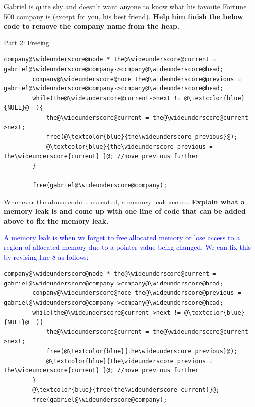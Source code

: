 \documentclass{article}
\newcommand{\wideunderscore}{\underline{\hphantom{n}}}
\begin{document}
\begin{enumerate}[label=(\alph*)]
    Gabriel is quite shy and doesn't want anyone to know what his favorite Fortune 500 company is (except for you, his best friend). \textbf{Help him finish the below code to remove the company name from the heap.}

    Part 2: Freeing
    \begin{lstlisting}[style = CStyle]
        company@\wideunderscore@node * the@\wideunderscore@current = gabriel@\wideunderscore@company->company@\wideunderscore@head;
        company@\wideunderscore@node the@\wideunderscore@previous = gabriel@\wideunderscore@company->company@\wideunderscore@head;
        while(the@\wideunderscore@current->next != @\textcolor{blue}{NULL}@  ){
            the@\wideunderscore@current = the@\wideunderscore@current->next;
            free(@\textcolor{blue}{the\wideunderscore previous}@);
            @\textcolor{blue}{the\wideunderscore previous = the\wideunderscore{current} }@; //move previous further
        }

        free(gabriel@\wideunderscore@company);
    \end{lstlisting}

    Whenever the above code is executed, a memory leak occurs. 
    \textbf{Explain what a memory leak is and come up with one line of code that can be added above to fix the memory leak.}\newline

    \textcolor{blue}{A memory leak is when we forget to free allocated memory or lose access to a region of allocated memory due to a pointer value being changed. We can fix this by revising line 8 as follows:}

    \begin{lstlisting}[style=CStyle]
    company@\wideunderscore@node * the@\wideunderscore@current = gabriel@\wideunderscore@company->company@\wideunderscore@head;
        company@\wideunderscore@node the@\wideunderscore@previous = gabriel@\wideunderscore@company->company@\wideunderscore@head;
        while(the@\wideunderscore@current->next != @\textcolor{blue}{NULL}@  ){
            the@\wideunderscore@current = the@\wideunderscore@current->next;
            free(@\textcolor{blue}{the\wideunderscore previous}@);
            @\textcolor{blue}{the\wideunderscore previous = the\wideunderscore{current} }@; //move previous further
        }
        @\textcolor{blue}{free(the\wideunderscore current)}@;
        free(gabriel@\wideunderscore@company);
    \end{lstlisting}

    
    

\end{enumerate}
\end{document}
